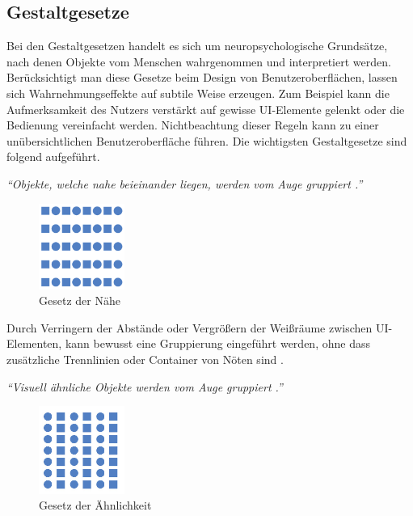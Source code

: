 \subsection{Gestaltgesetze} \label{sec:uidRules}
Bei den Gestaltgesetzen handelt es sich um neuropsychologische Grundsätze, nach denen Objekte vom Menschen wahrgenommen und interpretiert werden. Berücksichtigt man diese Gesetze beim Design von Benutzeroberflächen, lassen sich Wahrnehmungseffekte auf subtile Weise erzeugen. Zum Beispiel kann die Aufmerksamkeit des Nutzers verstärkt auf gewisse UI-Elemente gelenkt oder die Bedienung vereinfacht werden. Nichtbeachtung dieser Regeln kann zu einer unübersichtlichen Benutzeroberfläche führen. Die wichtigsten Gestaltgesetze sind folgend aufgeführt.\par
{}
\textit{\enquote{Objekte, welche nahe beieinander liegen, werden vom Auge gruppiert \cite[S. 186]{Moser2012}.}}\par
\begin{figure}[H]
 \centering
 \includegraphics[width=0.25\textwidth]{grafiken/Gesetz_Naehe.png}
 \caption{Gesetz der Nähe \cite{Schossmann}}
 \label{fig:gesetzNaehe}
\end{figure} 
Durch Verringern der Abstände oder Vergrößern der Weißräume zwischen UI-Elementen, kann bewusst eine Gruppierung eingeführt werden, ohne dass zusätzliche Trennlinien oder Container von Nöten sind \cite[S. 186]{Moser2012}.\par
{}
\textit{\enquote{Visuell ähnliche Objekte werden vom Auge gruppiert \cite[S. 187]{Moser2012}.}}\par
\begin{figure}[H]
 \centering
 \includegraphics[width=0.25\textwidth]{grafiken/Gesetz_Aehnl.png}
 \caption{Gesetz der Ähnlichkeit \cite{Grigo}}
 \label{fig:gesetzAehnl}
\end{figure} 
